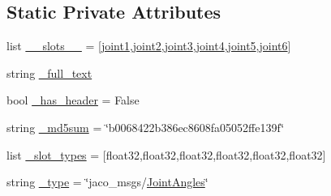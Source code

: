 \subsection*{Static Private Attributes}
\begin{DoxyCompactItemize}
\item 
list \hyperlink{classjaco__msgs_1_1msg_1_1__JointAngles_1_1JointAngles_a3e737e50c253271aa19ed12620925721}{\+\_\+\+\_\+slots\+\_\+\+\_\+} = \mbox{[}\textquotesingle{}\hyperlink{classjaco__msgs_1_1msg_1_1__JointAngles_1_1JointAngles_a8be523d467fa53d4135c9d2886b97581}{joint1}\textquotesingle{},\textquotesingle{}\hyperlink{classjaco__msgs_1_1msg_1_1__JointAngles_1_1JointAngles_a2a6a4e51ad21da90c02fa3f2f4522c2c}{joint2}\textquotesingle{},\textquotesingle{}\hyperlink{classjaco__msgs_1_1msg_1_1__JointAngles_1_1JointAngles_afa25a110a90e720afd3b53454034f6cd}{joint3}\textquotesingle{},\textquotesingle{}\hyperlink{classjaco__msgs_1_1msg_1_1__JointAngles_1_1JointAngles_a63efb8f5a7a09f5747508607924a164a}{joint4}\textquotesingle{},\textquotesingle{}\hyperlink{classjaco__msgs_1_1msg_1_1__JointAngles_1_1JointAngles_ade1528f8e4d6132a7a6067ddf91a66f7}{joint5}\textquotesingle{},\textquotesingle{}\hyperlink{classjaco__msgs_1_1msg_1_1__JointAngles_1_1JointAngles_ac1c8aa58c2bb7efd3ca6f1711bd425ee}{joint6}\textquotesingle{}\mbox{]}
\item 
string \hyperlink{classjaco__msgs_1_1msg_1_1__JointAngles_1_1JointAngles_a84e8ef5d8c1e8067d101cd9151305359}{\+\_\+full\+\_\+text}
\item 
bool \hyperlink{classjaco__msgs_1_1msg_1_1__JointAngles_1_1JointAngles_aa8cc8f192158b491cebfe2700025cb01}{\+\_\+has\+\_\+header} = False
\item 
string \hyperlink{classjaco__msgs_1_1msg_1_1__JointAngles_1_1JointAngles_a6eea3f6d65b9a05aa85bc43855b5e59e}{\+\_\+md5sum} = \char`\"{}b0068422b386ec8608fa05052ffe139f\char`\"{}
\item 
list \hyperlink{classjaco__msgs_1_1msg_1_1__JointAngles_1_1JointAngles_aa42bcf08a8fd843da6b23c66fdc2148b}{\+\_\+slot\+\_\+types} = \mbox{[}\textquotesingle{}float32\textquotesingle{},\textquotesingle{}float32\textquotesingle{},\textquotesingle{}float32\textquotesingle{},\textquotesingle{}float32\textquotesingle{},\textquotesingle{}float32\textquotesingle{},\textquotesingle{}float32\textquotesingle{}\mbox{]}
\item 
string \hyperlink{classjaco__msgs_1_1msg_1_1__JointAngles_1_1JointAngles_afb288e8eaa594ba6ac21c8a8f1a8056b}{\+\_\+type} = \char`\"{}jaco\+\_\+msgs/\hyperlink{classjaco__msgs_1_1msg_1_1__JointAngles_1_1JointAngles}{Joint\+Angles}\char`\"{}
\end{DoxyCompactItemize}


